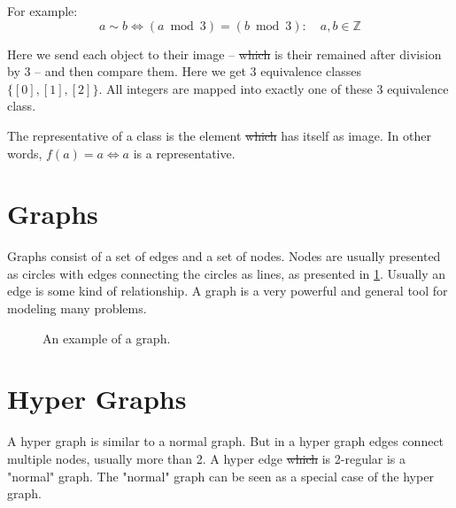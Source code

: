 \documentclass[msc,lith,english]{liuthesis}
\providecommand{\DIFadd}[1]{{\protect\color{blue}\uwave{#1}}} %
\providecommand{\DIFdel}[1]{{\protect\color{red}\sout{#1}}}                      %
\providecommand{\DIFaddbegin}{} %
\providecommand{\DIFaddend}{} %
\providecommand{\DIFdelbegin}{} %
\providecommand{\DIFdelend}{} %
\begin{document}
For example:
$$
  a \sim b \iff (a \bmod 3) = (b \bmod 3) : \quad a, b \in \mathds{Z}
$$

Here we send each object to their image -- \DIFdelbegin \DIFdel{which }\DIFdelend \DIFaddbegin \DIFadd{that }\DIFaddend is their remained after division by 3 -- and then compare them.
Here we get 3 equivalence classes $\{[0], [1], [2]\}$. All integers are mapped into exactly one of these 3 equivalence class.

The representative of a class is the element \DIFdelbegin \DIFdel{which }\DIFdelend \DIFaddbegin \DIFadd{that }\DIFaddend has itself as image. In other words, $f(a) = a \iff a$ is a representative.
\cite[Section 7.3]{sourceArmen} \cite[Section 1.2]{sourceAATA}

\section{Graphs}
Graphs consist of a set of edges and a set of nodes.
Nodes are usually presented as circles with edges connecting the circles as lines, as presented in \ref{figGraphExample}.
Usually an edge is some kind of relationship. 
A graph is a very powerful and general tool for modeling many problems.

\begin{center}
\begin{figure}[h]
\centering
{}
  \caption{An example of a graph.}
  \label{figGraphExample}
\end{figure}
\end{center}

\cite[Chapter 1]{sourceDiestel}
\cite[Chapter 1]{sourceGWA}
\cite[Section 9.1]{sourceArmen}


\section{Hyper Graphs}
A hyper graph is similar to a normal graph.
But in a hyper graph edges connect multiple nodes, usually more than 2.
A hyper edge \DIFdelbegin \DIFdel{which }\DIFdelend \DIFaddbegin \DIFadd{that }\DIFaddend is 2-regular is a "normal" graph.
The "normal" graph can be seen as a special case of the hyper graph.
\end{document}
